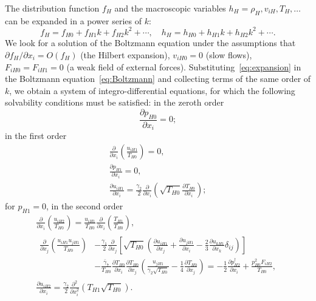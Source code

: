 \documentclass[10pt]{article}
\newcommand{\pder}[2][]{\frac{\partial#1}{\partial#2}}
\newcommand{\pderdual}[2][]{\frac{\partial^2#1}{\partial#2^2}}
\newcommand{\Pder}[2][]{\partial#1/\partial#2}
\newcommand{\OO}[1]{O(#1)}
\begin{document}
The distribution function \(f_H\) and the macroscopic variables \(h_H = \rho_H, v_{iH}, T_H, \dots\)
can be expanded in a power series of \(k\):
\begin{equation}\label{eq:expansion}
    f_H = f_{H0} + f_{H1}k + f_{H2}k^2 + \cdots, \quad h_H = h_{H0} + h_{H1}k + h_{H2}k^2 + \cdots.
\end{equation}
We look for a solution of the Boltzmann equation under the assumptions that
\(\Pder[f_H]{x_i} = \OO{f_H}\) (the Hilbert expansion), \(v_{iH0} = 0\) (slow flows),
\(F_{iH0} = F_{iH1} = 0\) (a weak field of external forces).
Substituting~\eqref{eq:expansion} in the Boltzmann equation~\eqref{eq:Boltzmann} and collecting terms of the same order of \(k\),
we obtain a system of integro-differential equations, for which the following solvability conditions must be satisfied:
in the zeroth order
\begin{equation}
    \pder[p_{H0}]{x_i} = 0; \label{eq:asymptotic0_p}
\end{equation}
in the first order
\begin{gather}
    \pder{x_i}\left(\frac{u_{iH1}}{T_{H0}}\right) = 0, \label{eq:asymptotic1_u} \\
    \pder[p_{H1}]{x_i} = 0, \label{eq:asymptotic1_p} \\
    \pder[u_{iH1}]{x_i} = \frac{\gamma_2}2\pder{x_i}\left(\sqrt{T_{H0}}\pder[T_{H0}]{x_i}\right); \label{eq:asymptotic1_T}
\end{gather}
for \(p_{H1} = 0\), in the second order
\begin{gather}
    \pder{x_i}\left(\frac{u_{iH2}}{T_{H0}}\right)
        = \frac{u_{iH1}}{T_{H0}}\pder{x_i}\left(\frac{T_{H1}}{T_{H0}}\right), \label{eq:asymptotic2_u} \\
    \begin{aligned}
        \pder{x_j}\left(\frac{u_{iH1}u_{jH1}}{T_{H0}}\right)
        &-\frac{\gamma_1}2\pder{x_j}\left[\sqrt{T_{H0}}\left(
            \pder[u_{iH1}]{x_j} + \pder[u_{jH1}]{x_i} - \frac23\pder[u_{kH1}]{x_k}\delta_{ij}
        \right)\right] \\
        &- \frac{\bar{\gamma}_7}{T_{H0}}\pder[T_{H0}]{x_i}\pder[T_{H0}]{x_j}\left(\frac{u_{jH1}}{\gamma_2\sqrt{T_{H0}}} - \frac{1}4\pder[T_{H0}]{x_j}\right)
        = -\frac12\pder[p_{H2}^\dag]{x_i} + \frac{p_{H0}^2 F_{iH2}}{T_{H0}},
    \end{aligned} \label{eq:asymptotic2_p} \\
    \pder[u_{iH2}]{x_i} = \frac{\gamma_2}2\pderdual{x_i}\left(T_{H1}\sqrt{T_{H0}}\right). \label{eq:asymptotic2_T}
\end{gather}
\end{document}
